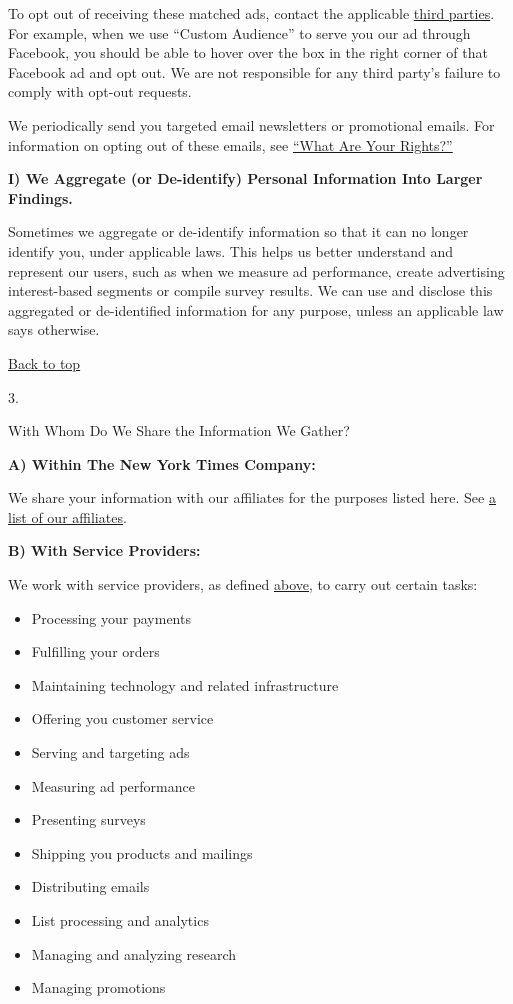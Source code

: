 To opt out of receiving these matched ads, contact the applicable
\href{/privacy/third-party}{third parties}. For example, when we use
``Custom Audience'' to serve you our ad through Facebook, you should be
able to hover over the box in the right corner of that Facebook ad and
opt out. We are not responsible for any third party's failure to comply
with opt-out requests.

We periodically send you targeted email newsletters or promotional
emails. For information on opting out of these emails, see
\protect\hyperlink{anchor-question4}{``What Are Your Rights?''}

\textbf{I) We Aggregate (or De-identify) Personal Information Into
Larger Findings.}

Sometimes we aggregate or de-identify information so that it can no
longer identify you, under applicable laws. This helps us better
understand and represent our users, such as when we measure ad
performance, create advertising interest-based segments or compile
survey results. We can use and disclose this aggregated or de-identified
information for any purpose, unless an applicable law says otherwise.

\href{app}{Back to top}

3.

With Whom Do We Share the Information We Gather?

\textbf{A) Within The New York Times Company:}

We share your information with our affiliates for the purposes listed
here. See
\href{https://help.nytimes.com/hc/en-us/articles/360004990014}{a list of
our affiliates}.

\textbf{B) With Service Providers:}

We work with service providers, as defined
\protect\hyperlink{anchor-question2-sectionE}{above}, to carry out
certain tasks:

\begin{itemize}
\tightlist
\item
  Processing your payments
\item
  Fulfilling your orders
\item
  Maintaining technology and related infrastructure
\item
  Offering you customer service
\item
  Serving and targeting ads
\item
  Measuring ad performance
\item
  Presenting surveys
\item
  Shipping you products and mailings
\item
  Distributing emails
\item
  List processing and analytics
\item
  Managing and analyzing research
\item
  Managing promotions
\end{itemize}

